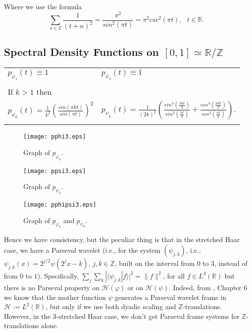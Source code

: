 \documentclass{birkmult}
\theoremstyle{definition}
\theoremstyle{remark}
\numberwithin{equation}{section}
\begin{document}
Where we use the formula
\[
  \sum_{n \in \mathbb{Z}} \frac{1}{(t+n)^{2}} = \frac{\pi^{2}}{sin^{2}(\pi t)}
  = \pi^{2}csc^{2}(\pi t), \text{    } t \in \mathbb{R}.
\]

\subsection*{Spectral Density Functions on $[0,1] \simeq \mathbb{R}/\mathbb{Z}$}
\begin{center}
\begin{tabular}{l l}
  \\
  $p_{\varphi_{1}}(t) \equiv 1$ \text{   } & \text{   } $p_{\psi_{1}}(t) \equiv 1$  \\ \\
  If $k>1$ then & \text{ } \\
  $p_{\varphi_{k}}(t)= \frac{1}{k^{2}}(\frac{sin(\pi kt)}{sin(\pi t)})^{2}$ \text{   } & \text{   } $p_{\psi_{k}}(t)= \frac{1}{(2k)^{2}}
(\frac{sin^{4}(\frac{\pi kt}{2})}{sin^{2}(\frac{\pi t}{2})}
+\frac{cos^{4}(\frac{\pi kt}{2})}{cos^{2}(\frac{\pi t}{2})})$. \\
  \\
\end{tabular}
\end{center}

\begin{figure}[htb]
\label{F:pphi3}
  \begin{center}
    \texttt{[image: pphi3.eps]}
    \caption{Graph of $p_{\varphi_{3}}$.}
  \end{center}
\end{figure}


\begin{figure}[htb]
\label{F:ppsi3}
  \begin{center}
    \texttt{[image: ppsi3.eps]}
    \caption{Graph of $p_{\psi_{3}}$.}
  \end{center}
\end{figure}


\begin{figure}[htb]
\label{F:pphipsi3}
  \begin{center}
    \texttt{[image: pphipsi3.eps]}
    \caption{Graph of $p_{\varphi_{3}}$ and $p_{\psi_{3}}$.}
  \end{center}
\end{figure}



Hence we have consistency, but the peculiar thing is that in the stretched Haar 
case, we have a Parseval wavelet (i.e., for the system $(\psi_{j,k})$, i.e., 
$\psi_{j,k}(x)=2^{j/2}\psi(2^{j}x-k)$, $j,k \in \mathbb{Z}$, built 
on the interval from $0$ to $3$, instead of from $0$ to $1$). Specifically, 
$\sum_{j}\sum_{k}|\langle \psi_{j,k}|f\rangle|^{2}= \|f\|^{2}$, for all 
$f \in L^{2}(\mathbb{R})$ but there is no Parseval property on 
$\mathcal{H}(\varphi)$ or on $\mathcal{H}(\psi)$. 
Indeed, from \cite{Jor06}, Chapter 6 we know that the mother function 
$\psi$ generates 
a Parseval wavelet frame in $\mathcal{H}:= L^{2}(\mathbb{R})$, but only if 
we use both dyadic scaling and $\mathbb{Z}$-translations. However, in the 
$3$-stretched Haar case, we don't get Parseval frame systems for 
$\mathbb{Z}$-translations alone.
\end{document}
